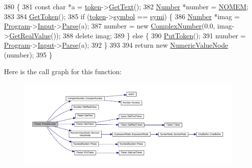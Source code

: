 \begin{DoxyCode}
380 \{
381     \textcolor{keyword}{const} \textcolor{keywordtype}{char} *a = \hyperlink{classParser_a467028559d31c5b33f16ca8be56715cc}{token}->\hyperlink{structToken_a15f1043de07ce8e452fbf115b85def71}{GetText}();
382     \hyperlink{structNumber}{Number} *number = \hyperlink{platform_8h_a46ff2bfbf0d44b8466a2251d5bd5e6f8}{NOMEM};
383 
384     \hyperlink{classParser_a415a103e66558b4d366d9a1420561fe3}{GetToken}();
385     \textcolor{keywordflow}{if} (\hyperlink{classParser_a467028559d31c5b33f16ca8be56715cc}{token}->\hyperlink{structToken_aa671eaaae5632c5277e89a090d864820}{symbol} == \hyperlink{lex_8h_a7feef761cd73fac6e25b8bb80d2c4e54ad05a0339b057b1842d956222973cbd98}{symi}) \{
386         \hyperlink{structNumber}{Number} *imag = \hyperlink{classProgram}{Program}->\hyperlink{classProgram_a6327f15962926e4f74f15e8ff56e04e5}{Input}->\hyperlink{classNumeralSystem_af3643941efdda71a873e2a31276f2d49}{Parse}(a);
387         number = \textcolor{keyword}{new} \hyperlink{structComplexNumber}{ComplexNumber}(0.0, imag->\hyperlink{structNumber_a83da654d465f1344162ce8b8f8c564b9}{GetRealValue}());
388         \textcolor{keyword}{delete} imag;
389     \} \textcolor{keywordflow}{else} \{
390         \hyperlink{classParser_adb5c3a188b36f7ecb198ae30f06338b3}{PutToken}();
391         number = \hyperlink{classProgram}{Program}->\hyperlink{classProgram_a6327f15962926e4f74f15e8ff56e04e5}{Input}->\hyperlink{classNumeralSystem_af3643941efdda71a873e2a31276f2d49}{Parse}(a);
392     \}
393 
394     \textcolor{keywordflow}{return} \textcolor{keyword}{new} \hyperlink{classNumericValueNode}{NumericValueNode} (number);
395 \}
\end{DoxyCode}


Here is the call graph for this function\+:
\nopagebreak
\begin{figure}[H]
\begin{center}
\leavevmode
\includegraphics[width=350pt]{d0/d40/classParser_a769d580b14d3d097ed255ad869cc1653_cgraph}
\end{center}
\end{figure}




